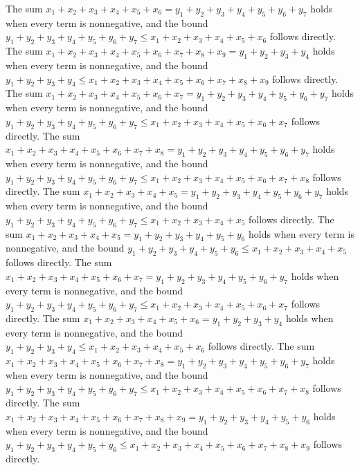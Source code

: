 \documentclass{article}
\begin{document}
The sum $x_{1} + x_{2} + x_{3} + x_{4} + x_{5} + x_{6} = y_{1} + y_{2} + y_{3} + y_{4} + y_{5} + y_{6} + y_{7}$ holds when every term is nonnegative, and the bound $y_{1} + y_{2} + y_{3} + y_{4} + y_{5} + y_{6} + y_{7} \le x_{1} + x_{2} + x_{3} + x_{4} + x_{5} + x_{6}$ follows directly.
The sum $x_{1} + x_{2} + x_{3} + x_{4} + x_{5} + x_{6} + x_{7} + x_{8} + x_{9} = y_{1} + y_{2} + y_{3} + y_{4}$ holds when every term is nonnegative, and the bound $y_{1} + y_{2} + y_{3} + y_{4} \le x_{1} + x_{2} + x_{3} + x_{4} + x_{5} + x_{6} + x_{7} + x_{8} + x_{9}$ follows directly.
The sum $x_{1} + x_{2} + x_{3} + x_{4} + x_{5} + x_{6} + x_{7} = y_{1} + y_{2} + y_{3} + y_{4} + y_{5} + y_{6} + y_{7}$ holds when every term is nonnegative, and the bound $y_{1} + y_{2} + y_{3} + y_{4} + y_{5} + y_{6} + y_{7} \le x_{1} + x_{2} + x_{3} + x_{4} + x_{5} + x_{6} + x_{7}$ follows directly.
The sum $x_{1} + x_{2} + x_{3} + x_{4} + x_{5} + x_{6} + x_{7} + x_{8} = y_{1} + y_{2} + y_{3} + y_{4} + y_{5} + y_{6} + y_{7}$ holds when every term is nonnegative, and the bound $y_{1} + y_{2} + y_{3} + y_{4} + y_{5} + y_{6} + y_{7} \le x_{1} + x_{2} + x_{3} + x_{4} + x_{5} + x_{6} + x_{7} + x_{8}$ follows directly.
The sum $x_{1} + x_{2} + x_{3} + x_{4} + x_{5} = y_{1} + y_{2} + y_{3} + y_{4} + y_{5} + y_{6} + y_{7}$ holds when every term is nonnegative, and the bound $y_{1} + y_{2} + y_{3} + y_{4} + y_{5} + y_{6} + y_{7} \le x_{1} + x_{2} + x_{3} + x_{4} + x_{5}$ follows directly.
The sum $x_{1} + x_{2} + x_{3} + x_{4} + x_{5} = y_{1} + y_{2} + y_{3} + y_{4} + y_{5} + y_{6}$ holds when every term is nonnegative, and the bound $y_{1} + y_{2} + y_{3} + y_{4} + y_{5} + y_{6} \le x_{1} + x_{2} + x_{3} + x_{4} + x_{5}$ follows directly.
The sum $x_{1} + x_{2} + x_{3} + x_{4} + x_{5} + x_{6} + x_{7} = y_{1} + y_{2} + y_{3} + y_{4} + y_{5} + y_{6} + y_{7}$ holds when every term is nonnegative, and the bound $y_{1} + y_{2} + y_{3} + y_{4} + y_{5} + y_{6} + y_{7} \le x_{1} + x_{2} + x_{3} + x_{4} + x_{5} + x_{6} + x_{7}$ follows directly.
The sum $x_{1} + x_{2} + x_{3} + x_{4} + x_{5} + x_{6} = y_{1} + y_{2} + y_{3} + y_{4}$ holds when every term is nonnegative, and the bound $y_{1} + y_{2} + y_{3} + y_{4} \le x_{1} + x_{2} + x_{3} + x_{4} + x_{5} + x_{6}$ follows directly.
The sum $x_{1} + x_{2} + x_{3} + x_{4} + x_{5} + x_{6} + x_{7} + x_{8} = y_{1} + y_{2} + y_{3} + y_{4} + y_{5} + y_{6} + y_{7}$ holds when every term is nonnegative, and the bound $y_{1} + y_{2} + y_{3} + y_{4} + y_{5} + y_{6} + y_{7} \le x_{1} + x_{2} + x_{3} + x_{4} + x_{5} + x_{6} + x_{7} + x_{8}$ follows directly.
The sum $x_{1} + x_{2} + x_{3} + x_{4} + x_{5} + x_{6} + x_{7} + x_{8} + x_{9} = y_{1} + y_{2} + y_{3} + y_{4} + y_{5} + y_{6}$ holds when every term is nonnegative, and the bound $y_{1} + y_{2} + y_{3} + y_{4} + y_{5} + y_{6} \le x_{1} + x_{2} + x_{3} + x_{4} + x_{5} + x_{6} + x_{7} + x_{8} + x_{9}$ follows directly.
\end{document}
